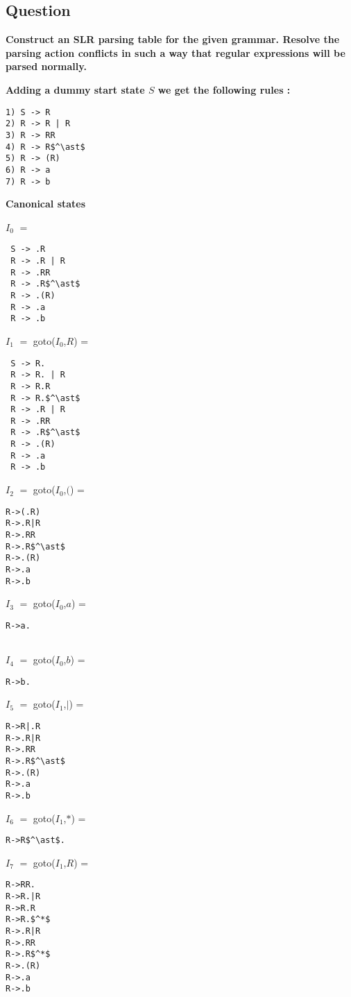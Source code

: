 \documentclass[12pt,fullpage]{exam}
\begin{document}
\begin{questions}
\section*{Question}
\question \textbf{Construct an SLR parsing table for the given grammar. Resolve the parsing action conflicts in such a way that regular expressions will be parsed
normally.}

\textbf{Adding a dummy start state $S$ we get the following rules :}
\begin{lstlisting}
1) S -> R
2) R -> R | R
3) R -> RR
4) R -> R$^\ast$
5) R -> (R)
6) R -> a
7) R -> b
\end{lstlisting}
\textbf{Canonical states}\\
\begin{multicols}{2}
$I_0$ $=$ 
\begin{lstlisting}
 S -> .R
 R -> .R | R
 R -> .RR
 R -> .R$^\ast$
 R -> .(R)
 R -> .a
 R -> .b

\end{lstlisting}

$I_1$ $=$ goto($I_0$,$R$) =
\begin{lstlisting}
 S -> R.
 R -> R. | R
 R -> R.R
 R -> R.$^\ast$
 R -> .R | R
 R -> .RR
 R -> .R$^\ast$
 R -> .(R)
 R -> .a
 R -> .b

\end{lstlisting}
$I_2$ $=$ goto($I_0$,$($) =
\begin{lstlisting}
R->(.R)
R->.R|R
R->.RR
R->.R$^\ast$
R->.(R)
R->.a
R->.b

\end{lstlisting}

$I_3$ $=$ goto($I_0$,$a$) =
\begin{lstlisting}
R->a.


\end{lstlisting}
$I_4$ $=$ goto($I_0$,$b$) =
\begin{lstlisting}
R->b.
\end{lstlisting}

$I_5$ $=$ goto($I_1$,$|$) =
\begin{lstlisting}
R->R|.R
R->.R|R
R->.RR
R->.R$^\ast$
R->.(R)
R->.a
R->.b

\end{lstlisting}
$I_6$ $=$ goto($I_1$,$*$) =
\begin{lstlisting}
R->R$^\ast$.

\end{lstlisting}

$I_7$ $=$ goto($I_1$,$R$) =
\begin{lstlisting}
R->RR.
R->R.|R
R->R.R
R->R.$^*$
R->.R|R
R->.RR
R->.R$^*$
R->.(R)
R->.a
R->.b


\end{lstlisting}
\end{multicols}
\end{questions}
\end{document}
